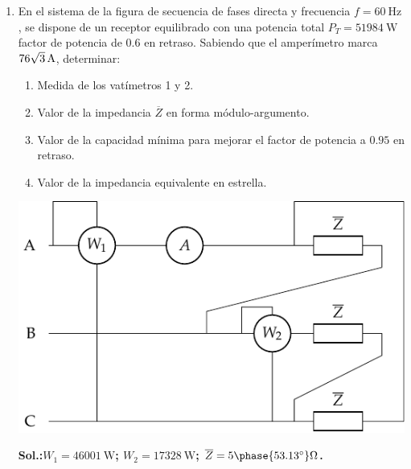 \begin{enumerate}
\item

  En el sistema de la figura de secuencia de fases directa y
  frecuencia $f=\qty{60}{\hertz}$, se dispone de un receptor
  equilibrado con una potencia total $P_T=\qty{51984}{\watt}$ factor
  de potencia de $0.6$ en retraso. Sabiendo que el amperímetro marca
  $\qty[parse-numbers=false]{76\sqrt{3}}{\ampere}$, determinar:
  \begin{enumerate}
  \item Medida de los vatímetros 1 y 2.
  \item Valor de la impedancia $\overline{Z}$ en forma
    módulo-argumento.
  \item Valor de la capacidad mínima para mejorar el factor de
    potencia a $0.95$ en retraso.
  \item Valor de la impedancia equivalente en estrella.
  \end{enumerate}
  \begin{center}
    \includegraphics[scale=0.8]{../figs/dosvat_triangulo.pdf}
  \end{center}
  \textbf{Sol.:$W_1 = \qty{46001}{\watt}$; $W_2=\qty{17328}{\watt}$;
    $\overline{Z} = {5\phase{\ang{53.13}}}\unit{\ohm}$.}

\end{enumerate}

